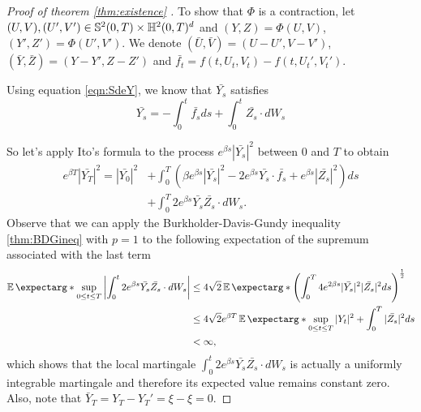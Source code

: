 \begin{proof}[Proof of theorem \ref{thm:existence} ]
To show that $\Phi$ is a contraction, let $(U,V),(U',V')\in \mathbb{S}^2(0,T)\times \mathbb{H}^2(0,T)^d$ and $(Y,Z)=\Phi(U,V)$, $(Y',Z')=\Phi(U',V')$. We denote $(\bar{U},\bar{V})=(U-U',V-V')$,  $(\bar{Y},\bar{Z})=(Y-Y',Z-Z')$ and $\bar{f_t}=f(t,U_t,V_t)-f(t,U_t',V_t')$. 

Using equation \eqref{eqn:SdeY}, we know that $\bar{Y_s}$ satisfies 
\begin{equation}
	\bar{Y_s}=-\int_{0}^{t}\bar{f_s}ds+\int_{0}^{t}\bar{Z_s}\cdot dW_s
\end{equation} 

So let's apply Ito's formula to the process $e^{\beta s}|\bar{Y_s}|^2$ between $0$ and $T$ to obtain
\begin{equation}
	\label{eqn:itoProof}
	\begin{split}
	e^{\beta T}|\bar{Y_T}|^2=|\bar{Y_0}|^2&+\int_{0}^{T}(\beta e^{\beta s}|\bar{Y_s}|^2-2e^{\beta s}\bar{Y_s}\cdot \bar{f_s}+e^{\beta s}|\bar{Z_s}|^2)ds\\
	&+\int_{0}^{T}2e^{\beta s}\bar{Y_s} \bar{Z_s}\cdot dW_s.
	\end{split}
\end{equation}
Observe that we can apply the Burkholder-Davis-Gundy inequality \ref{thm:BDGineq} with $p=1$ to the following expectation of the supremum associated with the last term
\begin{equation}
	\begin{split}
	\expect*{\sup_{0\leq t \leq T}\left|\int_{0}^{t}2e^{\beta s}\bar{Y_s} \bar{Z_s}\cdot dW_s\right|}&\leq 4\sqrt{2} \expect*{\left(\int_{0}^{T}4e^{2\beta s}|\bar{Y_s}|^2 |\bar{Z_s}|^2 ds\right)^{\frac{1}{2}}} \\
	& \leq 4\sqrt{2}e^{\beta T} \expect*{\sup_{0\leq t\leq T}|Y_t|^2+\int_{0}^{T}|\bar{Z_s}|^2 ds}\\
	&<\infty,
	\end{split}
\end{equation}
which shows that the local martingale $\int_{0}^{t}2e^{\beta s}\bar{Y_s} \bar{Z_s}\cdot dW_s$ is actually a uniformly integrable martingale and therefore its expected value remains constant zero. Also, note that $\bar{Y}_T=Y_T-Y_T'=\xi-\xi=0$.


\end{proof}
